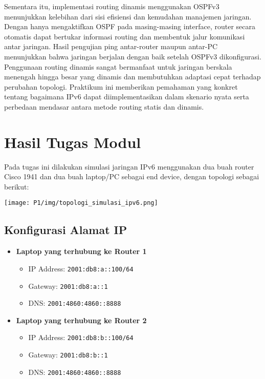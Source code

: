 Sementara itu, implementasi routing dinamis menggunakan OSPFv3 menunjukkan kelebihan dari sisi efisiensi dan kemudahan manajemen jaringan. Dengan hanya mengaktifkan OSPF pada masing-masing interface, router secara otomatis dapat bertukar informasi routing dan membentuk jalur komunikasi antar jaringan. Hasil pengujian ping antar-router maupun antar-PC menunjukkan bahwa jaringan berjalan dengan baik setelah OSPFv3 dikonfigurasi. Penggunaan routing dinamis sangat bermanfaat untuk jaringan berskala menengah hingga besar yang dinamis dan membutuhkan adaptasi cepat terhadap perubahan topologi. Praktikum ini memberikan pemahaman yang konkret tentang bagaimana IPv6 dapat diimplementasikan dalam skenario nyata serta perbedaan mendasar antara metode routing statis dan dinamis.

\section{Hasil Tugas Modul}

Pada tugas ini dilakukan simulasi jaringan IPv6 menggunakan dua buah router Cisco 1941 dan dua buah laptop/PC sebagai end device, dengan topologi sebagai berikut:

\begin{center}
\texttt{[image: P1/img/topologi\_simulasi\_ipv6.png]}
\end{center}

\subsection*{Konfigurasi Alamat IP}

\begin{itemize}
    \item \textbf{Laptop yang terhubung ke Router 1}
    \begin{itemize}
        \item IP Address: \texttt{2001:db8:a::100/64}
        \item Gateway: \texttt{2001:db8:a::1}
        \item DNS: \texttt{2001:4860:4860::8888}
    \end{itemize}

    \item \textbf{Laptop yang terhubung ke Router 2}
    \begin{itemize}
        \item IP Address: \texttt{2001:db8:b::100/64}
        \item Gateway: \texttt{2001:db8:b::1}
        \item DNS: \texttt{2001:4860:4860::8888}
    \end{itemize}
\end{itemize}

